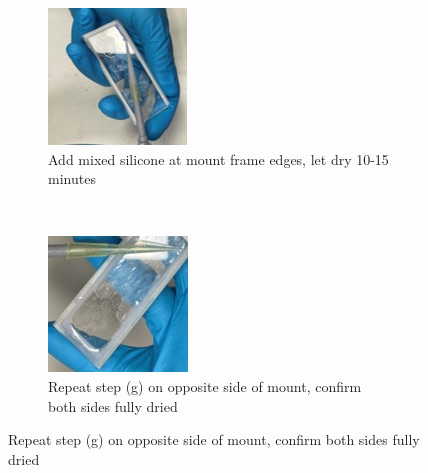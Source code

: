 \begin{figure}[H]
\medskip
\begin{subfigure}{.4\linewidth}
  \includegraphics[width=\linewidth]{Images/Step7.jpg}
  \caption{Add mixed silicone at mount frame edges, let dry 10-15 minutes}
  \label{velcomp}
\end{subfigure}\hfill 
~
\begin{subfigure}{.4\linewidth}
  \includegraphics[width=\linewidth]{Images/Step8.jpg}
  \caption{Repeat step (g) on opposite side of mount, confirm both sides fully dried}
  \label{estcomp}
\end{subfigure}\hfill 
    

\end{figure}
